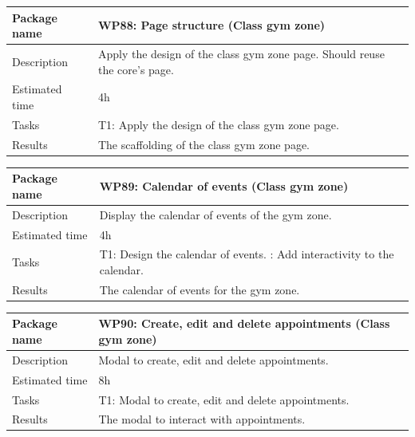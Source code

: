 \documentclass[a4paper, 12pt, oneside]{book}
\begin{document}
\vspace*{16pt}
\begin{tabularx}{\textwidth}{| l | X |}
	\hline
	\rowcolor{rowColor}
	{\semibf Package name}   & {\semibf WP88}: Page structure (Class gym zone)                            \\
	\hline
	{\semibf Description}    & Apply the design of the class gym zone page. Should reuse the core's page. \\
	\hline
	\rowcolor{rowColor}
	{\semibf Estimated time} & 4h                                                                         \\
	\hline
	{\semibf Tasks}          & {\semibf T1}: Apply the design of the class gym zone page.                 \\
	\hline
	\rowcolor{rowColor}
	{\semibf Results}        & The scaffolding of the class gym zone page.                                \\
	\hline
\end{tabularx}
\vspace*{16pt}
\begin{tabularx}{\textwidth}{| l | X |}
	\hline
	\rowcolor{rowColor}
	{\semibf Package name}   & {\semibf WP89}: Calendar of events (Class gym zone) \\
	\hline
	{\semibf Description}    & Display the calendar of events of the gym zone.     \\
	\hline
	\rowcolor{rowColor}
	{\semibf Estimated time} & 4h                                                  \\
	\hline
	{\semibf Tasks}          & {\semibf T1}: Design the calendar of events.
	\newline{\semibf T2}: Add interactivity to the calendar.                       \\
	\hline
	\rowcolor{rowColor}
	{\semibf Results}        & The calendar of events for the gym zone.            \\
	\hline
\end{tabularx}
\vspace*{16pt}
\begin{tabularx}{\textwidth}{| l | X |}
	\hline
	\rowcolor{rowColor}
	{\semibf Package name}   & {\semibf WP90}: Create, edit and delete appointments (Class gym zone) \\
	\hline
	{\semibf Description}    & Modal to create, edit and delete appointments.                        \\
	\hline
	\rowcolor{rowColor}
	{\semibf Estimated time} & 8h                                                                    \\
	\hline
	{\semibf Tasks}          & {\semibf T1}: Modal to create, edit and delete appointments.          \\
	\hline
	\rowcolor{rowColor}
	{\semibf Results}        & The modal to interact with appointments.                              \\
	\hline
\end{tabularx}
\end{document}
